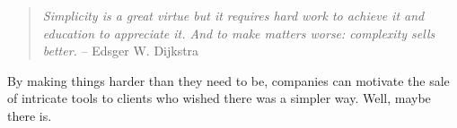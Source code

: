 \documentclass[landscape,	DIV=calc,%
							paper=letter,%
							fontsize=10pt,%
							twocolumn]{scrartcl}	 					%
\begin{document}
\begin{quote}{\em Simplicity is a great virtue but it requires hard work to achieve
it and education to appreciate it. And to make matters worse:
complexity sells better.}\newline
-- Edsger W. Dijkstra
\end{quote}

By making things harder than they need to be, companies can motivate
the sale  of intricate tools to clients who wished there was a
simpler way. Well, maybe there is.


\clearpage
{}

\end{document}
